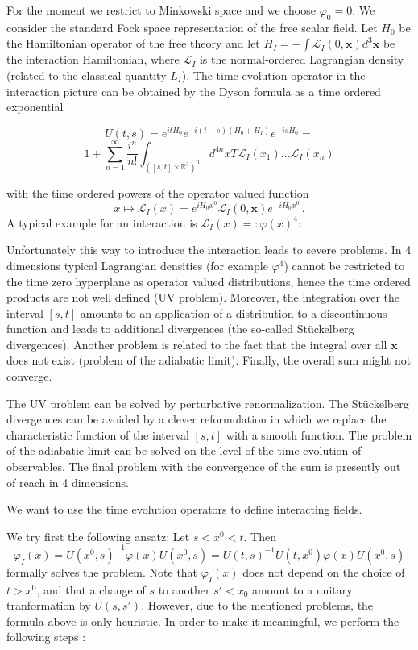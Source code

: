 \documentclass[11pt]{article}
\newcommand{\Lcal}{\mathcal {L}}
\newcommand{\ph}{\varphi}
\newcommand{\1}{\mathds{1}}                         %
\begin{document}
{{For the moment we restrict to Minkowski space and we choose $\ph_0=0$. We consider the standard Fock space representation of the free scalar field. Let $H_0$ be the Hamiltonian operator of the free theory and let  $H_I=-\int  \Lcal_I(0,\mathbf x)d^3\mathbf x$ be the interaction Hamiltonian, where $\Lcal_I$ is the normal-ordered Lagrangian density (related to the classical quantity ${L_I}$). The time evolution operator in the interaction picture can be obtained by the Dyson formula as a time ordered exponential

{\[U(t,s)=e^{itH_0}e^{-i(t-s)(H_0+H_I)}e^{-isH_0}=\]
\[1+\sum_{n=1}^\infty\frac{i^n}{n!}\int_ {([s,t]\times\mathbb R^3)^n}d^{4n}xT\Lcal_I(x_1)\dots \Lcal_I(x_n)\]}
%
{with the time ordered powers of the operator valued function
\[x\mapsto \Lcal_I(x)=e^{iH_0x^0}\Lcal_I(0,\mathbf x)e^{-iH_0x^0}\,.
\]
{A typical example for an interaction is $\Lcal_I(x)=:\ph(x)^4:$}

Unfortunately this way to introduce the interaction leads to severe problems. In 4 dimensions typical Lagrangian densities (for example $\ph^4$) cannot be restricted to the time zero hyperplane as operator valued distributions, hence the time ordered products are not well defined (UV problem). Moreover, the integration over the interval $[s,t]$ amounts to an application of a distribution to a discontinuous function and leads to additional divergences (the so-called St\"uckelberg divergences). Another problem is related to the fact that the integral over all $\mathbf x$ does not exist (problem of the adiabatic limit). Finally, the overall sum might not converge.

{The UV problem can be solved by perturbative renormalization. The St\"uckelberg divergences can be avoided by a clever reformulation in which we replace the characteristic function of the interval $[s,t]$ with a smooth function. The problem of the adiabatic limit can be solved on the level of the time evolution of observables. The final problem with the convergence of the sum is presently out of reach in 4 dimensions.}

We want to use the time evolution operators to define interacting fields.
{We try first the following ansatz: Let $s<x^0<t$. Then
\[\ph_I(x)=U(x^0,s)^{-1}\ph(x)U(x^0,s)=U(t,s)^{-1}U(t,x^0)\ph(x)U(x^0,s)\]
formally solves the problem.
Note that $\ph_I(x)$ does not depend on the choice of $t>x^0$, and that a change of $s$ to another $s'<x_0$ amount to a unitary tranformation by $U(s,s')$. However, due to the mentioned problems, the formula above is only heuristic. In order to make it meaningful, we perform the following steps :

}}}}
\end{document}
